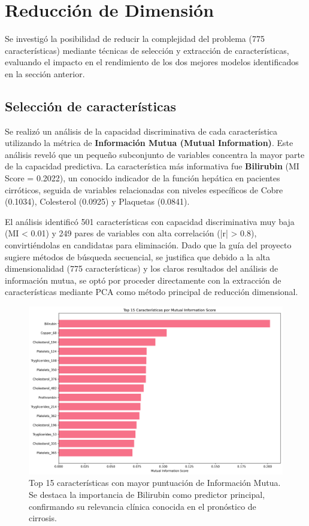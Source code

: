 \documentclass[journal]{IEEEtai}
\begin{document}
\section{Reducción de Dimensión}
Se investigó la posibilidad de reducir la complejidad del problema (775 características) mediante técnicas de selección y extracción de características, evaluando el impacto en el rendimiento de los dos mejores modelos identificados en la sección anterior.

\subsection{Selección de características}
Se realizó un análisis de la capacidad discriminativa de cada característica utilizando la métrica de \textbf{Información Mutua (Mutual Information)}. Este análisis reveló que un pequeño subconjunto de variables concentra la mayor parte de la capacidad predictiva. La característica más informativa fue \textbf{Bilirubin} (MI Score = 0.2022), un conocido indicador de la función hepática en pacientes cirróticos, seguida de variables relacionadas con niveles específicos de Cobre (0.1034), Colesterol (0.0925) y Plaquetas (0.0841).

El análisis identificó 501 características con capacidad discriminativa muy baja (MI < 0.01) y 249 pares de variables con alta correlación (|r| > 0.8), convirtiéndolas en candidatas para eliminación. Dado que la guía del proyecto sugiere métodos de búsqueda secuencial, se justifica que debido a la alta dimensionalidad (775 características) y los claros resultados del análisis de información mutua, se optó por proceder directamente con la extracción de características mediante PCA como método principal de reducción dimensional.

\begin{figure}[!t]
\centering
\includegraphics[width=\columnwidth]{graficas/importancia_caracteristicas_mi.png}
\caption{Top 15 características con mayor puntuación de Información Mutua. Se destaca la importancia de Bilirubin como predictor principal, confirmando su relevancia clínica conocida en el pronóstico de cirrosis.}
\label{fig:mi_features}
\end{figure}
\end{document}
